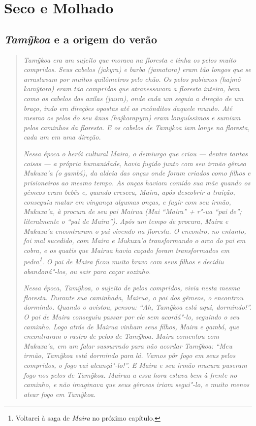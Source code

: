 \section{Seco e Molhado}\label{seco-e-molhado}

\subsection{\emph{Tamỹkoa} e a origem do verão}

\begin{quote}


\emph{\emph{Tamỹkoa} era um sujeito que morava na floresta e tinha os pelos
muito compridos. Seus cabelos (\emph{jakyra}) e barba (\emph{jamatara})
eram tão longos que se arrastavam por muitos quilômetros pelo chão. Os
pelos pubianos (\emph{hajmõ} \emph{kamỹtara}) eram tão compridos que
atravessavam a floresta inteira, bem como os cabelos das axilas
(\emph{jaura}), onde cada um seguia a direção de um braço, indo em
direções opostas até os recônditos daquele mundo. Até mesmo os pelos do
seu ânus (\emph{hajkarapyra}) eram longuíssimos e sumiam pelos caminhos
da floresta. E os cabelos de \emph{Tamỹkoa} iam longe na floresta, cada
um em uma direção.}

\emph{Nessa época o herói cultural \emph{Maira}, o demiurgo que criou --- dentre
tantas coisas --- a própria humanidade, havia fugido junto com seu irmão
gêmeo \emph{Mukuxa'a} (o gambá), da aldeia das onças onde foram criados
como filhos e prisioneiros ao mesmo tempo. As onças haviam comido sua
mãe quando os gêmeos eram bebês e, quando cresceu, \emph{Maira}, após
descobrir a traição, conseguiu matar em vingança algumas onças, e fugir
com seu irmão, \emph{Mukuxa'a}, à procura de seu pai \emph{Mairua}
(\emph{Mai} ``\emph{Maira}'' + \emph{r"-ua} ``pai de''; literalmente o
``pai de \emph{Maira}''). Após um tempo de procura, \emph{Maira} e
\emph{Mukuxa'a} encontraram o pai vivendo na floresta. O encontro, no
entanto, foi mal sucedido, com \emph{Maira} e \emph{Mukuxa'a} transformando o
arco do pai em cobra, e os quatis que \emph{Mairua} havia caçado foram
transformados em pedra\footnote{Voltarei à saga de \emph{Maira} no
  próximo capítulo.}. O pai de \emph{Maira} ficou muito bravo com seus
filhos e decidiu abandoná"-los, ou sair para caçar sozinho.}

\emph{Nessa época, \emph{Tamỹkoa}, o sujeito de pelos compridos, vivia nesta
mesma floresta. Durante sua caminhada, \emph{Mairua}, o pai dos gêmeos,
o encontrou dormindo. Quando o avistou, pensou: ``Ah, \emph{Tamỹkoa}
está aqui, dormindo!''. O pai de \emph{Maira} conseguiu passar por ele
sem acordá"-lo, seguindo o seu caminho. Logo atrás de \emph{Mairua}
vinham seus filhos, \emph{Maira} e gambá, que encontraram o rastro de
pelos de \emph{Tamỹkoa}. \emph{Maira} comentou com \emph{Mukuxa'a}, em
um falar sussurrado para não acordar \emph{Tamỹkoa}: ``Meu irmão,
\emph{Tamỹkoa} está dormindo para lá. Vamos pôr fogo em seus pelos
compridos, o fogo vai alcançá"-lo!''. E \emph{Maira} e seu irmão mucura
puseram fogo nos pelos de \emph{Tamỹkoa}. \emph{Mairua} a essa hora
estava bem à frente no caminho, e não imaginava que seus gêmeos iriam
segui"-lo, e muito menos atear fogo em \emph{Tamỹkoa}.}


\end{quote}
